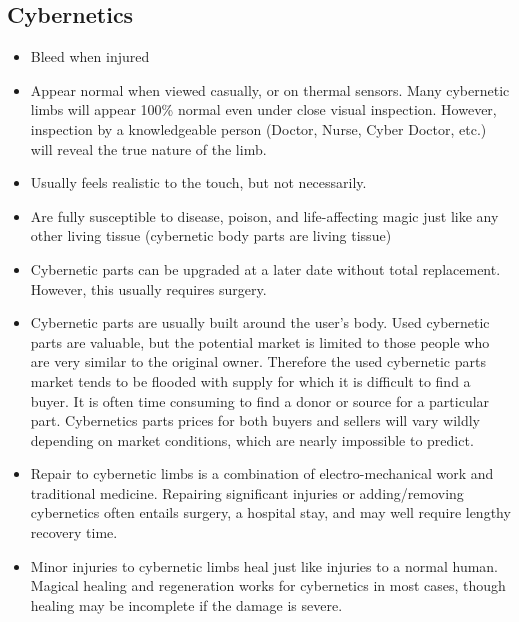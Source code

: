 \documentclass[twoside]{book}
\begin{document}
    

\subsection{Cybernetics}
    
\begin{itemize}
      
  \item   Bleed when injured 
  \item   Appear normal when viewed casually, or on thermal
                 sensors. Many cybernetic limbs will appear 100\% normal
                 even under close visual inspection. However, inspection
                 by a knowledgeable person (Doctor, Nurse, Cyber Doctor,
                 etc.) will reveal the true nature of the limb. 
  \item   Usually feels realistic to the touch, but not
                 necessarily. 
  \item   Are fully susceptible to disease, poison, and
                 life-affecting magic just like any other living tissue
                 (cybernetic body parts are living tissue) 
  \item   Cybernetic parts can be upgraded at a later date
                 without total replacement. However, this usually
                 requires surgery. 
  \item   Cybernetic parts are usually built around the
                 user's body. Used cybernetic parts are valuable,
                 but the potential market is limited to those people who
                 are very similar to the original owner. Therefore the
                 used cybernetic parts market tends to be flooded with
                 supply for which it is difficult to find a buyer. It is
                 often time consuming to find a donor or source for a
                 particular part. Cybernetics parts prices for both
                 buyers and sellers will vary wildly depending on market
                 conditions, which are nearly impossible to predict.
                 
  \item   Repair to cybernetic limbs is a combination of
                 electro-mechanical work and traditional medicine.
                 Repairing significant injuries or adding/removing
                 cybernetics often entails surgery, a hospital stay, and
                 may well require lengthy recovery time. 
  \item   Minor injuries to cybernetic limbs heal just like
                 injuries to a normal human. Magical healing and
                 regeneration works for cybernetics in most cases, though
                 healing may be incomplete if the damage is severe.
                 
\end{itemize}
  
\end{document}
